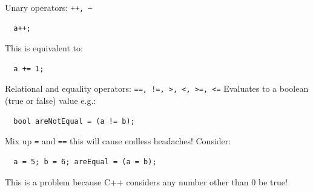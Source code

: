 \documentclass{beamer}
\begin{document}
\begin{frame}[fragile]
  \begin{block}{Unary operators: \texttt{++, --}}
    \begin{lstlisting}
  a++;
   \end{lstlisting}
   This is equivalent to:
   \begin{lstlisting}
  a += 1;
   \end{lstlisting}
  \end{block}
  \pause
  \begin{block}{Relational and equality operators: \texttt{==, !=, >, <, >=, <=}}
  Evaluates to a boolean (true or false) value e.g.:
    \begin{lstlisting}
  bool areNotEqual = (a != b);
   \end{lstlisting}
 \end{block}
 \pause
 \begin{dontblocke}%
 Mix up \texttt{=} and \texttt{==} this will cause endless headaches!  Consider:
 \begin{lstlisting}
  a = 5; b = 6; areEqual = (a = b);
 \end{lstlisting}
 This is a problem because C++ considers any number other than 0 be true!
 \end{dontblocke}
\end{frame}
\end{document}
